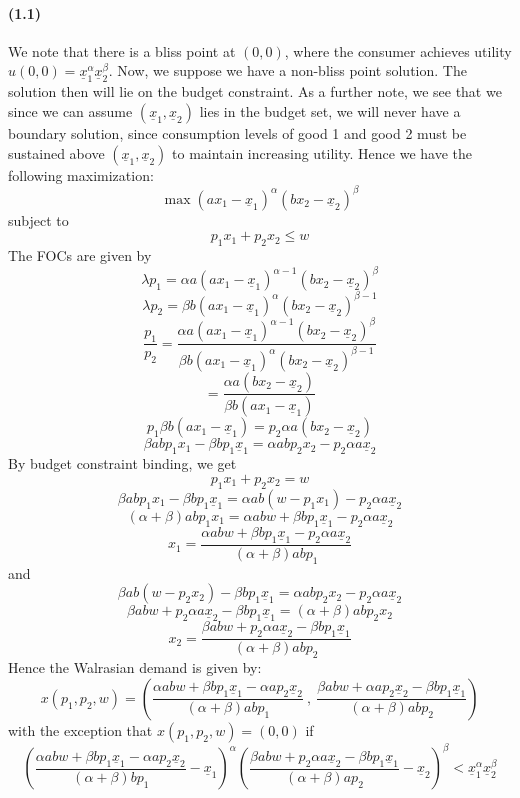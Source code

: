\documentclass[10pt,letter]{article}
\begin{document}
\paragraph{(1.1)}
We note that there is a bliss point at $(0,0)$, where the consumer achieves utility $u(0,0) = \underline{x}_1^\alpha\underline{x}_2^\beta$. Now, we suppose we have a  non-bliss point solution. The solution then will lie on the budget constraint. As a further note, we see that we since we can assume $(\underline{x}_1,\underline{x}_2)$ lies in the budget set, we will never have a boundary solution, since consumption levels of good 1 and good 2 must be sustained above $(\underline{x}_1,\underline{x}_2)$ to maintain increasing utility. Hence we have the following maximization:
\[ \max (ax_1 - \underline{x}_1)^\alpha(bx_2 - \underline{x}_2)^\beta \]
subject to
\[ p_1 x_1 + p_2 x_2 \le w \]
The FOCs are given by
\[ \lambda p_1 = \alpha a (ax_1 - \underline{x}_1)^{\alpha-1}(bx_2 - \underline{x}_2)^\beta \]
\[ \lambda p_2 = \beta b (ax_1 - \underline{x}_1)^{\alpha}(bx_2 - \underline{x}_2)^{\beta -1}\]
\[ \frac{p_1}{p_2}=  \frac{\alpha a (ax_1 - \underline{x}_1)^{\alpha-1}(bx_2 - \underline{x}_2)^\beta}{\beta b (ax_1 - \underline{x}_1)^{\alpha}(bx_2 - \underline{x}_2)^{\beta -1}} \]
\[  =  \frac{\alpha a (bx_2 - \underline{x}_2)}{\beta b (ax_1 - \underline{x}_1) } \]
\[ p_1\beta b (ax_1 - \underline{x}_1) = p_2 \alpha a (bx_2 - \underline{x}_2)  \]
\[ \beta ab p_1x_1 - \beta bp_1\underline{x}_1 = \alpha a bp_2 x_2 - p_2 \alpha a\underline{x}_2 \]
By budget constraint binding, we get
\[ p_1x_1+ p_2x_2 = w \]
\[ \beta ab p_1x_1 - \beta bp_1\underline{x}_1 = \alpha a b(w - p_1x_1) - p_2 \alpha a\underline{x}_2 \]
\[ (\alpha + \beta) ab p_1x_1 = \alpha abw + \beta bp_1\underline{x}_1- p_2 \alpha a\underline{x}_2  \]
\[ x_1 = \frac{\alpha abw + \beta bp_1\underline{x}_1- p_2 \alpha a\underline{x}_2}{(\alpha + \beta) ab p_1}  \]
and
\[ \beta ab (w - p_2x_2) - \beta bp_1\underline{x}_1 = \alpha a bp_2x_2 - p_2 \alpha a\underline{x}_2 \]
\[ \beta ab w + p_2 \alpha a\underline{x}_2 - \beta bp_1\underline{x}_1 = (\alpha+\beta) a bp_2x_2 \]
\[ x_2 = \frac{\beta ab w + p_2 \alpha a\underline{x}_2 - \beta bp_1\underline{x}_1}{(\alpha+\beta) a bp_2} \]
Hence the Walrasian demand is given by:
\[ x(p_1, p_2, w) = \left(\frac{\alpha abw + \beta bp_1\underline{x}_1- \alpha ap_2 \underline{x}_2}{(\alpha + \beta) ab p_1}\ , \ \frac{\beta ab w + \alpha ap_2 \underline{x}_2 - \beta bp_1\underline{x}_1}{(\alpha+\beta) a bp_2} \right) \]
with the exception that $x(p_1, p_2, w) = (0,0)$ if
\[ \left(\frac{\alpha abw + \beta bp_1\underline{x}_1- \alpha ap_2 \underline{x}_2}{(\alpha + \beta) b p_1} - \underline{x}_1\right)^\alpha\left(\frac{\beta ab w + p_2 \alpha a\underline{x}_2 - \beta bp_1\underline{x}_1}{(\alpha+\beta) a p_2} - \underline{x}_2\right)^\beta < \underline{x}_1^\alpha \underline{x}_2^\beta \]
\end{document}
